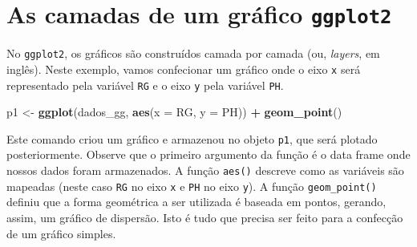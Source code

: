 \documentclass[
]{book}
\newenvironment{Shaded}{\begin{snugshade}}{\end{snugshade}}
\newcommand{\CommentTok}[1]{\textcolor[rgb]{0.56,0.35,0.01}{\textit{#1}}}
\newcommand{\DataTypeTok}[1]{\textcolor[rgb]{0.13,0.29,0.53}{#1}}
\newcommand{\KeywordTok}[1]{\textcolor[rgb]{0.13,0.29,0.53}{\textbf{#1}}}
\newcommand{\NormalTok}[1]{#1}
\newcommand{\OperatorTok}[1]{\textcolor[rgb]{0.81,0.36,0.00}{\textbf{#1}}}
\newcommand{\StringTok}[1]{\textcolor[rgb]{0.31,0.60,0.02}{#1}}
\begin{document}
\begin{Shaded}
\end{Shaded}

\hypertarget{as-camadas-de-um-gruxe1fico-ggplot2}{%
\section{\texorpdfstring{As camadas de um gráfico \texttt{ggplot2}}{As camadas de um gráfico ggplot2}}\label{as-camadas-de-um-gruxe1fico-ggplot2}}

No \texttt{ggplot2}, os gráficos são construídos camada por camada (ou, \emph{layers}, em inglês). Neste exemplo, vamos confecionar um gráfico onde o eixo \texttt{x} será representado pela variável \texttt{RG} e o eixo \texttt{y} pela variável \texttt{PH}.

\begin{Shaded}
\begin{Highlighting}[]
\NormalTok{p1 <-}\StringTok{ }\KeywordTok{ggplot}\NormalTok{(dados_gg, }\KeywordTok{aes}\NormalTok{(}\DataTypeTok{x =}\NormalTok{ RG, }\DataTypeTok{y =}\NormalTok{ PH)) }\OperatorTok{+}
\StringTok{      }\KeywordTok{geom_point}\NormalTok{()}
\end{Highlighting}
\end{Shaded}

Este comando criou um gráfico e armazenou no objeto \texttt{p1}, que será plotado posteriormente. Observe que o primeiro argumento da função é o data frame onde nossos dados foram armazenados. A função \texttt{aes()}  descreve como as variáveis são mapeadas (neste caso \texttt{RG} no eixo \texttt{x} e \texttt{PH} no eixo \texttt{y}). A função \texttt{geom\_point()} definiu que a forma geométrica a ser utilizada é baseada em pontos, gerando, assim, um gráfico de dispersão. Isto é tudo que precisa ser feito para a confecção de um gráfico simples.
\end{document}
